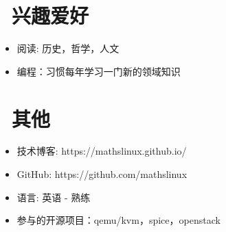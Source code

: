 \documentclass{resume}
\begin{document}
\section{\faHeartO\ 兴趣爱好}
\begin{itemize}[parsep=0.5ex]
  \item 阅读: 历史，哲学，人文
  \item 编程：习惯每年学习一门新的领域知识
\end{itemize}

\section{\faInfo\ 其他}
\begin{itemize}[parsep=0.5ex]
  \item 技术博客: https://mathslinux.github.io/
  \item GitHub: https://github.com/mathslinux
  \item 语言: 英语 - 熟练
  \item 参与的开源项目：qemu/kvm，spice，openstack
\end{itemize}

%
%
\end{document}
